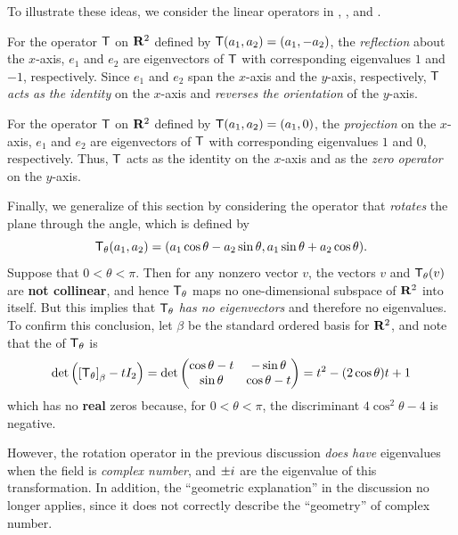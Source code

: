 To illustrate these ideas, we consider the linear operators in , , and .

For the operator \(\textsf{T}\) on \(\mathbf{R}^2\) defined by \(\textsf{T}(a_1, a_2) = (a_1, -a_2)\), the \emph{reflection} about the \(x\)-axis, \(e_1\) and \(e_2\) are eigenvectors of \(\textsf{T}\) with corresponding eigenvalues \(1\) and \(-1\), respectively.
Since \(e_1\) and \(e_2\) span the \(x\)-axis and the \(y\)-axis, respectively, \(\textsf{T}\) \emph{acts as the identity} on the \(x\)-axis and \emph{reverses the orientation}
of the \(y\)-axis.

For the operator \(\textsf{T}\) on \(\mathbf{R}^2\) defined by \(\textsf{T}(a_1, a_2) = (a_1, 0)\), the \emph{projection} on the \(x\)-axis, \(e_1\) and \(e_2\) are eigenvectors of \(\textsf{T}\) with corresponding eigenvalues \(1\) and \(0\), respectively.
Thus, \(\textsf{T}\) acts as the identity on the \(x\)-axis and as the \emph{zero operator} on the \(y\)-axis.

Finally, we generalize  of this section by considering the operator that \emph{rotates} the plane through the angle, which is defined by
\[
    \textsf{T}_{\theta}(a_1, a_2) = (a_1 \cos \theta - a_2 \sin \theta, a_1 \sin \theta + a_2 \cos \theta).
\]
Suppose that \(0 < \theta < \pi\).
Then for any nonzero vector \(v\), the vectors \(v\) and \(\textsf{T}_{\theta}(v)\) are \textbf{not collinear}, and hence \(\textsf{T}_{\theta}\) maps no one-dimensional subspace of \(\mathbf{R}^2\) into itself.
But this implies that \(\textsf{T}_{\theta}\) \emph{has no eigenvectors} and therefore no eigenvalues.
To confirm this conclusion, let \(\beta\) be the standard ordered basis for \(\mathbf{R}^2\), and note that the \CPOLY{} of \(\textsf{T}_{\theta}\) is
\[
    \det\left(\left[\textsf{T}_{\theta}\right]_{\beta}-t I_{2}\right)
    = \det \begin{pmatrix}
        \cos \theta-t & -\sin \theta \\
        \sin \theta & \cos \theta-t
    \end{pmatrix}
    = t^{2} - (2 \cos \theta) t + 1
\]
which has no \textbf{real} zeros because, for \(0 < \theta < \pi\), the discriminant \(4 \cos^2 \theta - 4\) is negative.

\begin{remark} \label{remark 5.1.10}
However, the rotation operator in the previous discussion \emph{does have} eigenvalues when the field is \emph{complex number}, and \(\pm {i\mkern1mu}\) are the eigenvalue of this transformation.
In addition, the ``geometric explanation'' in the discussion no longer applies, since it does not correctly describe the ``geometry'' of complex number.
\end{remark}
